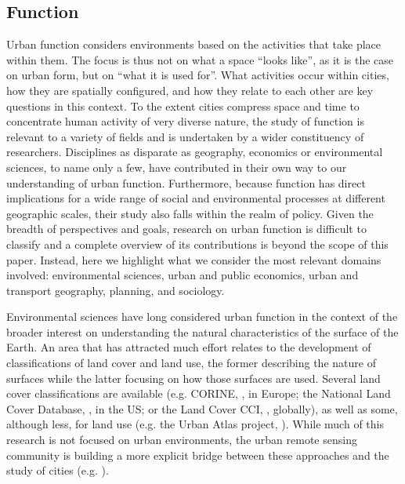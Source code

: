 \subsection{Function}
\label{sec:lit_function}


Urban function considers environments based on the activities that take place
within them.
%
The focus is thus not on what a space ``looks
like'', as it is the case on urban form, but on ``what it is used for''. What
activities occur within cities, how they are spatially configured, and how
they relate to each other are key questions in this context.
%
To the extent cities compress space and time to concentrate human activity of
very diverse nature, the study of function is relevant to a variety of
fields and is undertaken by a wider constituency of researchers. Disciplines
as disparate as geography, economics or environmental sciences, to name only a
few, have contributed in their own way to our understanding of urban
function.
Furthermore, because function has direct implications for a wide range of
social and environmental processes at different geographic scales, their study
also falls within the realm of policy.
%
Given the breadth of perspectives and goals, research on urban function is
difficult to classify and a complete overview of its contributions is beyond
the scope of this paper. Instead, here we highlight what we consider the
most relevant domains involved: environmental
sciences, urban and public economics, urban and transport geography, planning, and
sociology.

Environmental sciences have long considered urban function
in the context of the broader interest on understanding the natural
characteristics of the surface of the Earth.
An area that has attracted much effort relates to the development of
classifications of land cover and land use, the former describing the nature of
surfaces while the latter focusing on how those surfaces are used. Several
land cover classifications are available (e.g. CORINE,
        \citealp{europeanenvironmentagency1990}, in Europe;
the National Land Cover Database, \citealp{homer2012national}, in the US; or
the Land Cover CCI, \citealp{defourny2012land}, globally), as well as some,
although less, for land use (e.g. the Urban Atlas project, \citealp{urban_atlas}).
While much of this research is not focused on urban environments, the urban
remote sensing community \citep{weng2018urban} is building a more explicit
bridge between these approaches and the study of cities
(e.g. \citealp{kuffer2016slums, georganos2018very, JOCHEM2018104, prasad2015remotely, stark2020satellite}).

